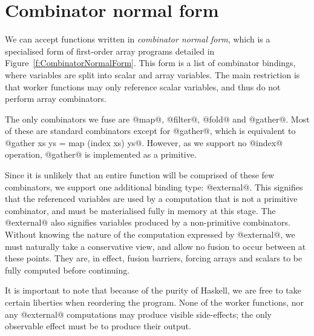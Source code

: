 \section{Combinator normal form}
We can accept functions written in \emph{combinator normal form}, which is a specialised form of first-order array programs detailed in Figure~\ref{f:CombinatorNormalForm}.
This form is a list of combinator bindings, where variables are split into scalar and array variables.
The main restriction is that worker functions may only reference scalar variables, and thus do not perform array combinators.

The only combinators we fuse are @map@, @filter@, @fold@ and @gather@.
Most of these are standard combinators except for @gather@, which is equivalent to @gather xs ys = map (index xs) ys@.
However, as we support no @index@ operation, @gather@ is implemented as a primitive.

Since it is unlikely that an entire function will be comprised of these few combinators, we support one additional binding type: @external@. This signifies that the referenced variables are used by a computation that is not a primitive combinator, and must be materialised fully in memory at this stage.
The @external@ also signifies variables produced by a non-primitive combinators.
Without knowing the nature of the computation expressed by @external@, we must naturally take a conservative view, and allow no fusion to occur between at these points. They are, in effect, fusion barriers, forcing arrays and scalars to be fully computed before continuing.

It is important to note that because of the purity of Haskell, we are free to take certain liberties when reordering the program.
None of the worker functions, nor any @external@ computations may produce visible side-effects; the only observable effect must be to produce their output.



